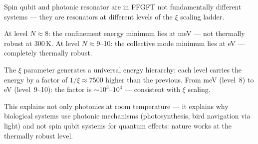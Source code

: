 \begin{center}
\end{center}

\begin{foundation}
Spin qubit and photonic resonator are
in FFGFT not fundamentally different systems ---
they are resonators at different levels
of the $\xi$ scaling ladder.

At level $N \approx 8$: the confinement energy minimum
lies at meV --- not thermally robust at 300\,K.
At level $N \approx 9$--10: the collective mode minimum
lies at eV --- completely thermally robust.

The $\xi$ parameter generates a universal
energy hierarchy: each level carries the energy
by a factor of $1/\xi \approx 7500$ higher than the previous.
From meV (level~8) to eV (level~9--10):
the factor is $\sim 10^3$--$10^4$ ---
consistent with $\xi$ scaling.

This explains not only photonics at room temperature ---
it explains why biological systems use photonic
mechanisms (photosynthesis, bird navigation via light)
and not spin qubit systems for quantum effects:
nature works at the thermally robust level.
\end{foundation}

